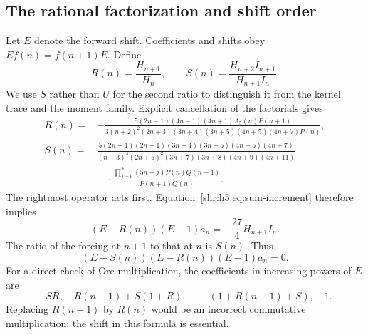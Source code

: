 \documentclass[11pt,letterpaper]{article}
\numberwithin{equation}{section}
\theoremstyle{definition}
\newcommand{\1}{\mathbf 1}
\begin{document}
\subsection{The rational factorization and shift order}
Let $E$ denote the forward shift. Coefficients and shifts obey
$Ef(n)=f(n+1)E$. Define
\begin{equation}
 R(n)=\frac{H_{n+1}}{H_n},\qquad
 S(n)=\frac{H_{n+2}I_{n+1}}{H_{n+1}I_n}.
 \label{shr:h5:eq:RS-ratios}
\end{equation}
We use $S$ rather than $U$ for the second ratio to distinguish it from the
kernel trace and the moment family. Explicit cancellation of the
factorials gives
\begin{align}
 R(n)={}&-\frac{5(2n-1)(4n-1)(4n+1)A_5(n)P(n+1)}
 {3(n+2)^2(2n+3)(3n+4)(3n+5)(4n+5)(4n+7)P(n)},
 \label{shr:h5:eq:R}\\
 S(n)={}&\frac{5(2n-1)(2n+1)(3n+4)(3n+5)(4n+5)(4n+7)}
 {(n+3)^4(2n+5)^2(3n+7)(3n+8)(4n+9)(4n+11)}\\
 &\hspace{1em}\cdot
 \frac{\prod_{j=6}^9(5n+j)P(n)Q(n+1)}{P(n+1)Q(n)}.
 \label{shr:h5:eq:S}
\end{align}
The rightmost operator acts first. Equation~\eqref{shr:h5:eq:sum-increment}
therefore implies
\begin{equation}
 (E-R(n))(E-1)a_n=-\frac{27}{4}H_{n+1}I_n.
 \label{shr:h5:eq:inhom-order2}
\end{equation}
The ratio of the forcing at $n+1$ to that at $n$ is $S(n)$. Thus
\begin{equation}
 (E-S(n))(E-R(n))(E-1)a_n=0.
 \label{shr:h5:eq:factored-annihilator}
\end{equation}
For a direct check of Ore multiplication, the coefficients in increasing
powers of $E$ are
\begin{equation}
 -SR,\quad R(n+1)+S(1+R),\quad
 -(1+R(n+1)+S),\quad1.
 \label{shr:h5:eq:monic-coeffs}
\end{equation}
Replacing $R(n+1)$ by $R(n)$ would be an incorrect commutative
multiplication; the shift in this formula is essential.
\end{document}
